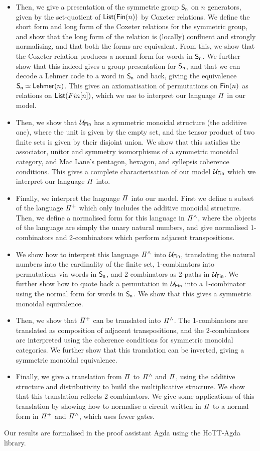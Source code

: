 \begin{itemize}
\item Then, we give a presentation of the symmetric group $\Sn[n]$ on $n$ generators, given by the set-quotient of $\List[\Fin[n]]$ by Coxeter relations. We define the short form and long form of the Coxeter relations for the symmetric group, and show that the long form of the relation is (locally) confluent and strongly normalising, and that both the forms are equivalent. From this, we show that the Coxeter relation produces a normal form for words in $\Sn$. We further show that this indeed gives a group presentation for $\Sn$, and that we can decode a Lehmer code to a word in $\Sn[n]$ and back, giving the equivalence $\Sn[n] \eqv \Lehmer[n]$. This gives an axiomatisation of permutations on $\Fin[n]$ as relations on $\List[Fin[n]]$, which we use to interpret our language $\mathit{\Pi}$ in our model.
\item Then, we show that $\UFin$ has a symmetric monoidal structure (the additive one), where the unit is given by the empty set, and the tensor product of two finite sets is given by their disjoint union. We show that this satisfies the associator, unitor and symmetry isomorphisms of a symmetric monoidal category, and Mac Lane's pentagon, hexagon, and syllepsis coherence conditions. This gives a complete characterisation of our model $\UFin$ which we interpret our language $\mathit{\Pi}$ into.
\item Finally, we interpret the language $\mathit{\Pi}$ into our model. First we define a subset of the language $\mathit{{\Pi}^{+}}$ which only includes the additive monoidal structure. Then, we define a normalised form for this language in $\mathit{{\Pi}^{\wedge}}$, where the objects of the language are simply the unary natural numbers, and give normalised 1-combinators and 2-combinators which perform adjacent transpositions.
\item We show how to interpret this language $\mathit{{\Pi}^{\wedge}}$ into $\UFin$, translating the natural numbers into the cardinality of the finite set, 1-combinators into permutations via words in $\Sn$, and 2-combinators as 2-paths in $\UFin$. We further show how to quote back a permutation in $\UFin$ into a 1-combinator using the normal form for words in $\Sn$. We show that this gives a symmetric monoidal equivalence.
\item Then, we show that $\mathit{{\Pi}^{+}}$ can be translated into $\mathit{{\Pi}^{\wedge}}$. The 1-combinators are translated as composition of adjacent transpositions, and the 2-combinators are interpreted using the coherence conditions for symmetric monoidal categories. We further show that this translation can be inverted, giving a symmetric monoidal equivalence.
\item Finally, we give a translation from $\mathit{\Pi}$ to $\mathit{{\Pi}^{\wedge}}$ and $\mathit{\Pi}$, using the additive structure and distributivity to build the multiplicative structure. We show that this translation reflects 2-combinators. We give some applications of this translation by showing how to normalise a circuit written in $\mathit{\Pi}$ to a normal form in $\mathit{{\Pi}^{+}}$ and $\mathit{{\Pi}^{\wedge}}$, which uses fewer gates.
\end{itemize}

Our results are formalised in the proof assistant Agda using the HoTT-Agda library.

